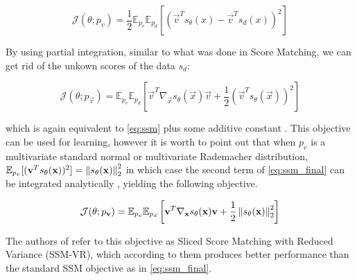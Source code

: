 \begin{equation}
    \label{eq:ssm}
    \mathcal{J}(\theta; p_v) = \frac{1}{2} \mathbb{E}_{p_v} \mathbb{E}_{p_d} \left[ \left( \vec{v}^T s_\theta(x) - \vec{v}^T s_d(x) \right)^2 \right]
\end{equation}

By using partial integration, similar to what was done in Score Matching, we can get rid of the unkown scores of the data $s_d$:

\begin{equation}
    \label{eq:ssm_final}
    \mathcal{J}(\theta; p_\vec{v}) = \mathbb{E}_{p_v} \mathbb{E}_{p_d} \left[ \vec{v}^T \nabla_\vec{x} s_\theta(\vec{x}) \vec{v} + \frac{1}{2} \left( \vec{v}^T s_\theta(\vec{x}) \right)^2 \right]
\end{equation}

which is again equivalent to \ref{eq:ssm} plus some additive constant \cite{ssm}. This objective can be used for learning, however
it is worth to point out that when $p_v$ is a multivariate standard normal or multivariate Rademacher distribution, 
$\mathbb{E}_{p_v} [ ( \textbf{v}^T s_\theta(\textbf{x}) )^2 ] = \left\lVert s_\theta(\textbf{x})\right\rVert_2^2$ in which case the second term 
of \ref{eq:ssm_final} can be integrated analytically \cite{ssm}, yielding the following objective.

\begin{equation}
    \label{eq:ssm_vr}
    \mathcal{J}(\theta; p_{\textbf{v}}) = \mathbb{E}_{p_v} \mathbb{E}_{p_d} \left[ \textbf{v}^T \nabla_{\textbf{x}} s_\theta(\textbf{x}) \textbf{v} + \frac{1}{2} \left\lVert s_\theta(\textbf{x}) \right\rVert^2_2 \right]
\end{equation}

The authors of \cite{ssm} refer to this objective as 
Sliced Score Matching with Reduced Variance (SSM-VR), which according to them produces better performance than the standard SSM objective as 
in \ref{eq:ssm_final}.





